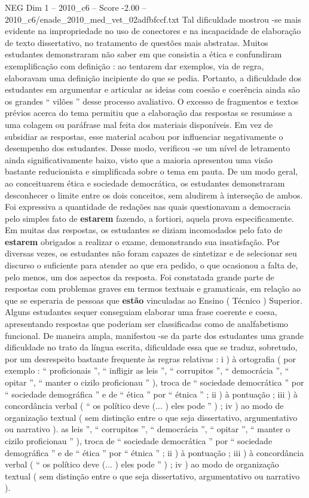 \begin{textsample}{NEG Dim 1 – 2010\_c6 – Score -2.00 – 2010\_c6/enade\_2010\_med\_vet\_02adfbfccf.txt}
Tal dificuldade mostrou -se mais evidente na impropriedade no uso de conectores e na incapacidade de elaboração de texto dissertativo, no tratamento de questões mais abstratas.
Muitos estudantes demonstraram não saber em que consistia a ética e confundiram exemplificação com definição : ao tentarem dar exemplos, via de regra, elaboravam uma definição incipiente do que se pedia.
Portanto, a dificuldade dos estudantes em argumentar e articular as ideias com coesão e coerência ainda são os grandes “ vilões ” desse processo avaliativo.
O excesso de fragmentos e textos prévios acerca do tema permitiu que a elaboração das respostas se resumisse a uma colagem ou paráfrase mal feita dos materiais disponíveis.
Em vez de subsidiar as respostas, esse material acabou por influenciar negativamente o desempenho dos estudantes.
Desse modo, verificou -se um nível de letramento ainda significativamente baixo, visto que a maioria apresentou uma visão bastante reducionista e simplificada sobre o tema em pauta.
De um modo geral, ao conceituarem ética e sociedade democrática, os estudantes demonstraram desconhecer o limite entre os dois conceitos, sem aludirem à interseção de ambos.
Foi expressiva a quantidade de redações nas quais questionavam a democracia pelo simples fato de \textbf{estarem} fazendo, a fortiori, aquela prova especificamente.
Em muitas das respostas, os estudantes se diziam incomodados pelo fato de \textbf{estarem} obrigados a realizar o exame, demonstrando sua insatisfação.
Por diversas vezes, os estudantes não foram capazes de sintetizar e de selecionar seu discurso o suficiente para atender ao que era pedido, o que ocasionou a falta de, pelo menos, um dos aspectos da resposta.
Foi constatada grande parte de respostas com problemas graves em termos textuais e gramaticais, em relação ao que se esperaria de pessoas que \textbf{estão} vinculadas ao Ensino ( Técnico ) Superior.
Alguns estudantes sequer conseguiam elaborar uma frase coerente e coesa, apresentando respostas que poderiam ser classificadas como de analfabetismo funcional.
De maneira ampla, manifestou -se da parte dos estudantes uma grande dificuldade no trato da língua escrita, dificuldade essa que se traduz, sobretudo, por um desrespeito bastante frequente às regras relativas : i ) à ortografia ( por exemplo : “ proficionais ”, “ infligir as leis ”, “ corrupitos ”, “ democrácia ”, “ opitar ”, “ manter o cizilo proficionau ” ), troca de “ sociedade democrática ” por “ sociedade demográfica ” e de “ ética ” por “ étnica ” ; ii ) à pontuação ; iii ) à concordância verbal ( “ os político deve (... ) eles pode ” ) ; iv ) ao modo de organização textual ( sem distinção entre o que seja dissertativo, argumentativo ou narrativo ). as leis ”, “ corrupitos ”, “ democrácia ”, “ opitar ”, “ manter o cizilo proficionau ” ), troca de “ sociedade democrática ” por “ sociedade demográfica ” e de “ ética ” por “ étnica ” ; ii ) à pontuação ; iii ) à concordância verbal ( “ os político deve (... ) eles pode ” ) ; iv ) ao modo de organização textual ( sem distinção entre o que seja dissertativo, argumentativo ou narrativo ).

\end{textsample}

